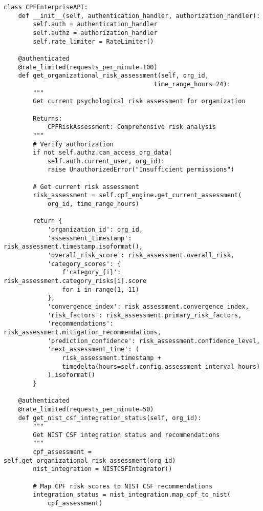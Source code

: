 \documentclass[10pt,twocolumn]{IEEEtran}
\begin{document}
\begin{lstlisting}[caption={Enterprise Integration API Specification}]
class CPFEnterpriseAPI:
    def __init__(self, authentication_handler, authorization_handler):
        self.auth = authentication_handler
        self.authz = authorization_handler
        self.rate_limiter = RateLimiter()
        
    @authenticated
    @rate_limited(requests_per_minute=100)
    def get_organizational_risk_assessment(self, org_id, 
                                         time_range_hours=24):
        """
        Get current psychological risk assessment for organization
        
        Returns:
            CPFRiskAssessment: Comprehensive risk analysis
        """
        # Verify authorization
        if not self.authz.can_access_org_data(
            self.auth.current_user, org_id):
            raise UnauthorizedError("Insufficient permissions")
        
        # Get current risk assessment
        risk_assessment = self.cpf_engine.get_current_assessment(
            org_id, time_range_hours)
        
        return {
            'organization_id': org_id,
            'assessment_timestamp': risk_assessment.timestamp.isoformat(),
            'overall_risk_score': risk_assessment.overall_risk,
            'category_scores': {
                f'category_{i}': risk_assessment.category_risks[i].score
                for i in range(1, 11)
            },
            'convergence_index': risk_assessment.convergence_index,
            'risk_factors': risk_assessment.primary_risk_factors,
            'recommendations': risk_assessment.mitigation_recommendations,
            'prediction_confidence': risk_assessment.confidence_level,
            'next_assessment_time': (
                risk_assessment.timestamp + 
                timedelta(hours=self.config.assessment_interval_hours)
            ).isoformat()
        }
    
    @authenticated
    @rate_limited(requests_per_minute=50)
    def get_nist_csf_integration_status(self, org_id):
        """
        Get NIST CSF integration status and recommendations
        """
        cpf_assessment = self.get_organizational_risk_assessment(org_id)
        nist_integration = NISTCSFIntegrator()
        
        # Map CPF risk scores to NIST CSF recommendations
        integration_status = nist_integration.map_cpf_to_nist(
            cpf_assessment)
        

\end{lstlisting}
\end{document}
